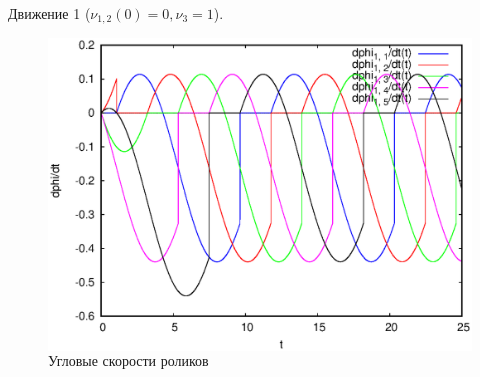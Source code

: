 \begin{frame}{Движение 1 ($\nu_{1,2}(0) = 0, \nu_3 = 1$).}
\begin{figure}[H]
\begin{columns}
                \includegraphics[width=\linewidth]{content/pic/self_rot_25/rol_vel.eps}
                \vspace{-15pt}
                \caption{Угловые скорости роликов}
        \end{columns}
    \end{figure}
\end{frame}

